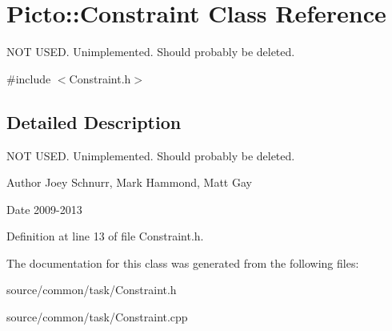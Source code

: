 \hypertarget{class_picto_1_1_constraint}{\section{Picto\-:\-:Constraint Class Reference}
\label{class_picto_1_1_constraint}
}


N\-O\-T U\-S\-E\-D. Unimplemented. Should probably be deleted.  




{\ttfamily \#include $<$Constraint.\-h$>$}



\subsection{Detailed Description}
N\-O\-T U\-S\-E\-D. Unimplemented. Should probably be deleted. 

\begin{DoxyAuthor}{Author}
Joey Schnurr, Mark Hammond, Matt Gay 
\end{DoxyAuthor}
\begin{DoxyDate}{Date}
2009-\/2013 
\end{DoxyDate}


Definition at line 13 of file Constraint.\-h.



The documentation for this class was generated from the following files\-:\begin{DoxyCompactItemize}
\item 
source/common/task/Constraint.\-h\item 
source/common/task/Constraint.\-cpp\end{DoxyCompactItemize}
